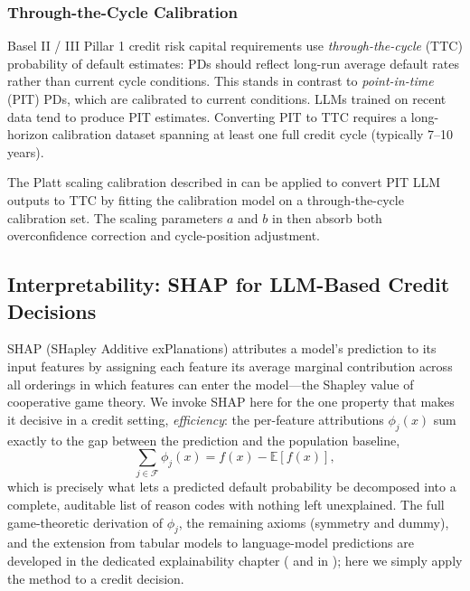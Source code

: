 \begin{context}
\subsubsection*{Through-the-Cycle Calibration}

Basel II / III Pillar 1 credit risk capital requirements use \emph{through-the-cycle} (TTC) probability of default estimates: PDs should reflect long-run average default rates rather than current cycle conditions. This stands in contrast to \emph{point-in-time} (PIT) PDs, which are calibrated to current conditions. LLMs trained on recent data tend to produce PIT estimates. Converting PIT to TTC requires a long-horizon calibration dataset spanning at least one full credit cycle (typically 7--10 years).

The Platt scaling calibration described in  can be applied to convert PIT LLM outputs to TTC by fitting the calibration model on a through-the-cycle calibration set. The scaling parameters $a$ and $b$ in  then absorb both overconfidence correction and cycle-position adjustment.

\subsection{Interpretability: SHAP for LLM-Based Credit Decisions}
\label{subsec:shap-credit}

SHAP (SHapley Additive exPlanations) \cite{lundberg2017unified} attributes a model's
prediction to its input features by assigning each feature its average marginal
contribution across all orderings in which features can enter the model---the Shapley
value of cooperative game theory. We invoke SHAP here for the one property that makes it
decisive in a credit setting, \emph{efficiency}: the per-feature attributions
$\phi_j(x)$ sum exactly to the gap between the prediction and the population baseline,
\begin{equation}
  \sum_{j \in \mathcal{F}} \phi_j(x) = f(x) - \mathbb{E}[f(x)],
  \label{eq:shap-efficiency}
\end{equation}
which is precisely what lets a predicted default probability be decomposed into a
complete, auditable list of reason codes with nothing left unexplained. The full
game-theoretic derivation of $\phi_j$, the remaining axioms (symmetry and dummy), and
the extension from tabular models to language-model predictions are developed in the
dedicated explainability chapter ( and 
in ); here we simply apply the method to a credit decision.


\end{context}
